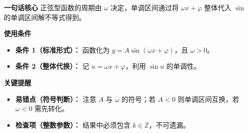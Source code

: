 \begin{summarybox}
	\textbf{\textcolor{CSummary}{一句话核心}}
	正弦型函数的周期由 $\omega$ 决定，单调区间通过将 $\omega x+\varphi$ 整体代入 $\sin$ 的单调区间解不等式得到。

	\medskip
	\textbf{\textcolor{CSummary}{使用条件}}
	\begin{itemize}[leftmargin=*, itemsep=0.5em, topsep=0.4em]
		\item \textbf{条件 1（标准形式）：} 函数化为 $y=A\sin(\omega x+\varphi)$，且 $\omega>0$。
		\item \textbf{条件 2（整体代换）：} 记 $u=\omega x+\varphi$，利用 $\sin u$ 的单调性。
	\end{itemize}

	\medskip
	\textbf{\textcolor{CSummary}{关键提醒}}
	\begin{itemize}[leftmargin=*, itemsep=0.5em, topsep=0.4em]
		\item \textbf{易错点（符号判断）：} 注意 $A$ 与 $\omega$ 的符号；若 $A<0$ 则单调区间互换，若 $\omega<0$ 需先转化。
		\item \textbf{检查项（整数参数）：} 结果中必须包含 $k\in\mathbb{Z}$，不可遗漏。
	\end{itemize}

\end{summarybox}
